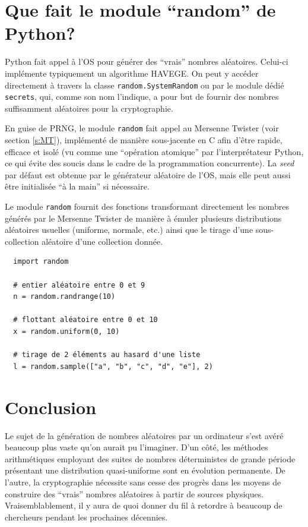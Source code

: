 \documentclass{scrartcl}
\begin{document}
\section{Que fait le module ``random'' de Python?}
Python fait appel à l'OS pour générer des ``vrais'' nombres aléatoires.
Celui-ci implémente typiquement un algorithme HAVEGE.
On peut y accéder directement à travers la classe \texttt{random.SystemRandom} ou par
le module dédié  \texttt{secrets}, qui, comme son nom l'indique, a pour but de
fournir des nombres suffisamment aléatoires pour la cryptographie.

En guise de PRNG, le module \texttt{random} fait appel au Mersenne Twister (voir
section \ref{s:MT}), implémenté de manière sous-jacente en C afin d'être rapide,
efficace et isolé (vu comme une ``opération atomique'' par l'interprétateur
Python, ce qui évite des soucis dans le cadre de la programmation concurrente).
La \textit{seed} par défaut est obtenue par le générateur aléatoire de l'OS,
mais elle peut aussi être initialisée ``à la main'' si nécessaire.

Le module \texttt{random} fournit des fonctions transformant directement les
nombres générés par le Mersenne Twister de manière à émuler plusieurs
distributions aléatoires usuelles (uniforme, normale, etc.) ainsi que le tirage
d'une sous-collection aléatoire d'une collection donnée.
\begin{lstlisting}
  import random

  # entier aléatoire entre 0 et 9
  n = random.randrange(10)

  # flottant aléatoire entre 0 et 10
  x = random.uniform(0, 10)

  # tirage de 2 éléments au hasard d'une liste
  l = random.sample(["a", "b", "c", "d", "e"], 2)
\end{lstlisting}

\section{Conclusion}
Le sujet de la génération de nombres aléatoires par un ordinateur s'est avéré
beaucoup plus vaste qu'on aurait pu l'imaginer. D'un côté, les méthodes
arithmétiques employant des suites de nombres déterministes de grande période
présentant une distribution quasi-uniforme sont en évolution permanente. De
l'autre, la cryptographie nécessite sans cesse des progrès dans les moyens de
construire des ``vrais'' nombres aléatoires à partir de sources
physiques. Vraisemblablement, il y aura de quoi donner du fil à retordre à
beaucoup de chercheurs pendant les prochaines décennies.

\printbibliography
\end{document}
